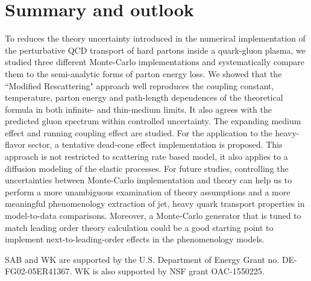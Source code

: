\documentclass[aps, prc, reprint, amsmath, groupedaddress, nofootinbib]{revtex4-1}
\begin{document}
\section{Summary and outlook}\label{section:summary}
To reduces the theory uncertainty introduced in the numerical implementation of the perturbative QCD transport of hard partons inside a quark-gluon plasma, we studied three different Monte-Carlo implementations and systematically compare them to the semi-analytic forms of parton energy loss.
We showed that the ``Modified Rescattering" approach well reproduces the coupling constant, temperature, parton energy and path-length dependences of the theoretical formula in both infinite- and thin-medium limits.
It also agrees with the predicted gluon spectrum within controlled uncertainty.
The expanding medium effect and running coupling effect are studied. For the application to the heavy-flavor sector, a tentative dead-cone effect implementation is proposed.
This approach is not restricted to scattering rate based model, it also applies to a diffusion modeling of the elastic processes. 
For future studies, controlling the uncertainties between Monte-Carlo implementation and theory can help us to perform a more unambiguous examination of theory assumptions and a more meaningful phenomenology extraction of jet, heavy quark transport properties in model-to-data comparisons.
Moreover, a Monte-Carlo generator that is tuned to match leading order theory calculation could be a good starting point to implement next-to-leading-order effects in the phenomenology models.

\begin{acknowledgments}
SAB and WK  are supported by the U.S. Department of Energy Grant no. DE-FG02-05ER41367. WK is also supported by NSF grant OAC-1550225.
\end{acknowledgments}
\end{document}
